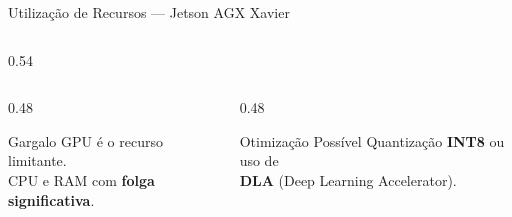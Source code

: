 \begin{frame}{Utilização de Recursos --- Jetson AGX Xavier}
\begin{columns}[c]
\begin{column}{0.54\textwidth}
    \end{column}
  \end{columns}

  \vspace{4mm}

  \begin{columns}[c]
    \begin{column}{0.48\textwidth}
      \begin{block}{\small Gargalo}
        \centering
        {\small GPU é o recurso limitante.\\
        CPU e RAM com \textbf{folga significativa}.}
      \end{block}
    \end{column}
    \begin{column}{0.48\textwidth}
      \begin{block}{\small Otimização Possível}
        \centering
        {\small Quantização \textbf{INT8} ou uso de\\
        \textbf{DLA} (Deep Learning Accelerator).}
      \end{block}
    \end{column}
  \end{columns}
\end{frame}

